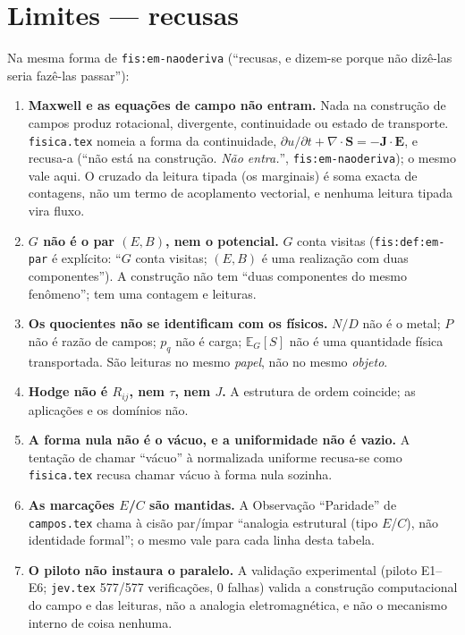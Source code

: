 \documentclass[11pt,a4paper]{article}
\begin{document}
\section{Limites --- recusas}\label{sec:limites}

\noindent Na mesma forma de \texttt{fis:em-naoderiva} (``recusas, e dizem-se
porque não dizê-las seria fazê-las passar''):

\begin{enumerate}[leftmargin=1.5em]
\item \textbf{Maxwell e as equações de campo não entram.} Nada na construção de
      campos produz rotacional, divergente, continuidade ou estado de
      transporte. \texttt{fisica.tex} nomeia a forma da continuidade,
      $\partial u/\partial t+\nabla\cdot\mathbf{S}=-\mathbf{J}\cdot\mathbf{E}$,
      e recusa-a (``não está na construção. \emph{Não entra.}'',
      \texttt{fis:em-naoderiva}); o mesmo vale aqui. O cruzado da leitura
      tipada (os marginais) é soma exacta de contagens, não um termo de
      acoplamento vectorial, e nenhuma leitura tipada vira fluxo.
\item \textbf{$G$ não é o par $(E,B)$, nem o potencial.} $G$ conta visitas
      (\texttt{fis:def:em-par} é explícito: ``$G$ conta visitas; $(E,B)$ é uma
      realização com duas componentes''). A construção não tem ``duas
      componentes do mesmo fenômeno''; tem uma contagem e leituras.
\item \textbf{Os quocientes não se identificam com os físicos.} $N/D$ não é o
      metal; $P$ não é razão de campos; $p_q$ não é carga; $\mathbb E_G[S]$
      não é uma quantidade física transportada. São leituras no mesmo
      \emph{papel}, não no mesmo \emph{objeto}.
\item \textbf{Hodge não é $R_{ij}$, nem $\tau$, nem $J$.} A estrutura de ordem
      coincide; as aplicações e os domínios não.
\item \textbf{A forma nula não é o vácuo, e a uniformidade não é vazio.} A
      tentação de chamar ``vácuo'' à normalizada uniforme recusa-se como
      \texttt{fisica.tex} recusa chamar vácuo à forma nula sozinha.
\item \textbf{As marcações $E$/$C$ são mantidas.} A Observação ``Paridade'' de
      \texttt{campos.tex} chama à cisão par/ímpar ``analogia estrutural (tipo
      $E$/$C$), não identidade formal''; o mesmo vale para cada linha desta
      tabela.
\item \textbf{O piloto não instaura o paralelo.} A validação experimental
      (piloto E1--E6; \texttt{jev.tex} 577/577 verificações, 0 falhas)
      valida a construção computacional do campo e das leituras, não a analogia
      eletromagnética, e não o mecanismo interno de coisa nenhuma.
\end{enumerate}
\end{document}
